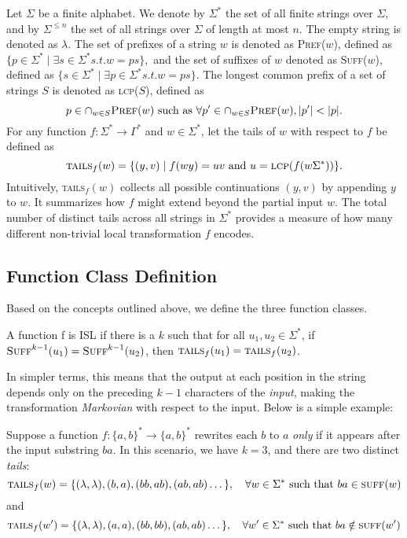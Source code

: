 Let $\Sigma$ be a finite alphabet. We denote by $\Sigma^*$ the set of all finite strings over $\Sigma$, and by $\Sigma^{\leq n}$ the set of all strings over $\Sigma$ of length at most $n$. The empty string is denoted as $\lambda$. The set of prefixes of a string $w$ is denoted as \textsc{Pref}($w$), defined as $\{p\in \Sigma^*\mid \exists s\in \Sigma^* s.t. w = ps\},$ and the set of suffixes of $w$ denoted as \textsc{Suff}($w$), defined as $\{s\in \Sigma^*\mid \exists p\in \Sigma^* s.t. w = ps\}.$ The longest common prefix of a set of strings $S$ is denoted as \textsc{lcp}($S$), defined as 
\begin{equation}
    p\in\cap_{w\in S}\textsc{Pref}(w) \text{ such as } \forall p'\in\cap_{w\in S}\textsc{Pref}(w), |p'| < |p|.
\end{equation}
For any function $f:\Sigma^*\to\Gamma^*$ and $w\in\Sigma^*$, let the tails of $w$ with respect to $f$ be defined as
\begin{equation}
    \textsc{tails}_f(w) = \{(y, v)\mid f(wy) = uv \text{ and }
    u = \textsc{lcp}(f(w\Sigma^*))\}.
\end{equation}
Intuitively, \textsc{tails}$_f(w)$ collects all possible continuations $(y, v)$ by appending $y$ to $w$. It summarizes how $f$ might extend beyond the partial input $w$. The total number of distinct tails across all strings in $\Sigma^*$ provides a measure of how many different non-trivial local transformation $f$ encodes.


\subsection{Function Class Definition}
Based on the concepts outlined above, we define the three function classes.
\begin{definition}[ISL]
A function f is ISL if there is a $k$ such that for all $u_1, u_2\in\Sigma^*$, if $\textsc{Suff}^{k-1}(u_1) = \textsc{Suff}^{k-1}(u_2)$, then $\textsc{tails}_f(u_1) = \textsc{tails}_f(u_2)$.
\end{definition}

In simpler terms, this means that the output at each position in the string depends only on the preceding $k-1$ characters of the \emph{input}, making the transformation \emph{Markovian} with respect to the input. Below is a simple example:
\begin{exmp}
Suppose a function $f:\{a, b\}^*\to\{a, b\}^*$ rewrites each $b$ to $a$ \emph{only} if it appears after the input substring $ba$. In this scenario, we have $k=3$, and there are two distinct \emph{tails}:
\begin{equation*}
    \textsc{tails}_f(w) = \{(\lambda, \lambda),  (b, a), (bb, ab), (ab, ab) \dots\}, \quad 
    \forall w\in\Sigma^*\text{ such that } ba\in\textsc{suff}(w) 
\end{equation*}
and
\begin{equation*}
\textsc{tails}_f(w') = \{(\lambda, \lambda),  (a, a), (bb, bb), (ab, ab) \dots\}, \quad \forall w'\in\Sigma^*\text{ such that } ba\notin \textsc{suff}(w')
\end{equation*}
\end{exmp}

